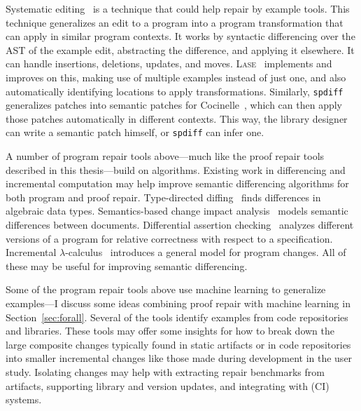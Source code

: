 Systematic editing~\cite{meng2011systematic} is a technique that could help repair by example tools.
This technique generalizes an edit to a program into a program transformation that can apply in similar program contexts.
It works by syntactic differencing over the AST of the example edit, abstracting the difference, and applying it elsewhere.
It can handle insertions, deletions, updates, and moves.
\textsc{Lase}~\cite{meng2013lase} implements and improves on this,
making use of multiple examples instead of just one, %
and also automatically identifying locations to apply transformations.
Similarly, \lstinline{spdiff}~\cite{andersen2010generic} generalizes patches into semantic patches for Cocinelle~\cite{padioleau2008documenting},
which can then apply those patches automatically in different contexts. This way, the library designer can write a semantic patch
himself, or \lstinline{spdiff} can infer one.

A number of program repair tools above---much like the proof repair tools described in this thesis---build on  algorithms.
Existing work in differencing and incremental computation may help 
improve semantic differencing algorithms for both program and proof repair.
Type-directed diffing~\cite{Miraldo:2017:TDS:3122975.3122976}
finds differences in algebraic data types.
Semantics-based change impact analysis~\cite{Autexier:2010:SCI:1860559.1860580} models semantic differences
between documents.
Differential assertion checking~\cite{differential-assertion-checking-2} analyzes different
versions of a program for relative correctness with respect to a specification.
Incremental $\lambda$-calculus~\cite{Cai:2014:TCH:2594291.2594304} introduces a general model for program changes.
All of these may be useful for improving semantic differencing.

Some of the program repair tools above use machine learning to generalize examples---I discuss some ideas combining proof repair
with machine learning in Section~\ref{sec:forall}.
Several of the tools identify examples from code repositories and libraries.
These tools may offer some insights for how to break down the large composite changes typically found in static artifacts or in code repositories
into smaller incremental changes like those made during development in the  user study.
Isolating changes may help with extracting repair benchmarks from artifacts, supporting library and version
updates, and integrating with  (CI) systems.

